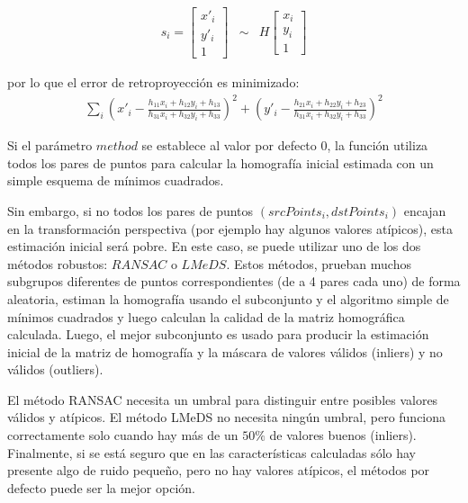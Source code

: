 \documentclass[a4paper,11pt,spanish]{article}
\begin{document}
\begin{eqnarray*}
s_{i}=\left[\begin{array}{c}
x'_{i}\\
y'_{i}\\
1
\end{array}\right] & \sim & H\left[\begin{array}{c}
x_{i}\\
y_{i}\\
1
\end{array}\right]
\end{eqnarray*}
 
por lo que el error de retroproyección es minimizado:
\begin{eqnarray*}
\underset{i}{\sum}\left(x'_{i}-\frac{h_{11}x_{i}+h_{12}y_{i}+h_{13}}{h_{31}x_{i}+h_{32}y_{i}+h_{33}}\right)^{2}+\left(y'_{i}-\frac{h_{21}x_{i}+h_{22}y_{i}+h_{23}}{h_{31}x_{i}+h_{32}y_{i}+h_{33}}\right)^{2}
\end{eqnarray*}

Si el parámetro $method$ se establece al valor por defecto $0$, la función utiliza todos los pares de puntos para calcular la homografía inicial estimada con un simple esquema de mínimos cuadrados. 

Sin embargo, si no todos los pares de puntos $(srcPoints_{i}, dstPoints_{i})$ encajan en la transformación perspectiva (por ejemplo hay algunos valores atípicos), esta estimación inicial será pobre. En este caso, se puede utilizar uno de los dos métodos robustos: $RANSAC$ o $LMeDS$. Estos métodos, prueban muchos subgrupos diferentes de puntos correspondientes (de a 4 pares cada uno) de forma aleatoria, estiman la homografía usando el subconjunto y el algoritmo simple de mínimos cuadrados y luego calculan la calidad  de la matriz homográfica calculada.
Luego, el mejor subconjunto es usado para producir la estimación inicial de la matriz de homografía y la máscara de valores válidos (inliers) y no válidos (outliers).


El método RANSAC 
necesita un umbral para distinguir entre posibles valores válidos y atípicos. El método LMeDS no necesita ningún umbral, pero funciona correctamente solo cuando hay más de un $50\%$ de valores buenos (inliers). Finalmente, si se está seguro que en las características calculadas sólo hay presente algo de ruido pequeño, pero no hay valores atípicos, el métodos por defecto puede ser la mejor opción.
\end{document}

